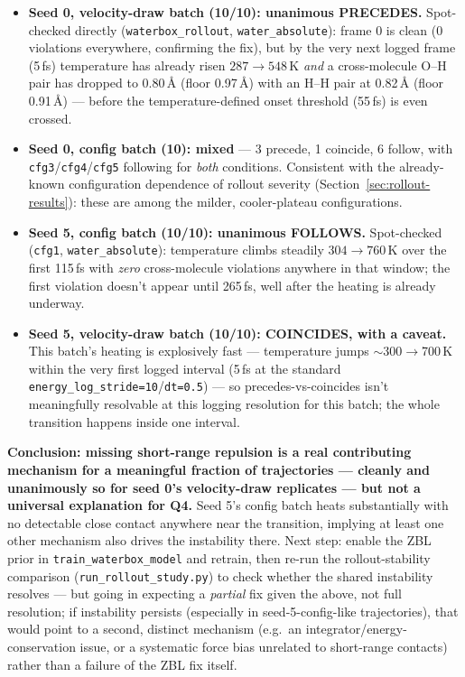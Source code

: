 \documentclass[11pt]{article}
\begin{document}
\begin{itemize}
\item \textbf{Seed 0, velocity-draw batch (10/10): unanimous PRECEDES.}
Spot-checked directly (\texttt{waterbox\_rollout}, \texttt{water\_absolute}):
frame 0 is clean (0 violations everywhere, confirming the fix), but by the
very next logged frame (5\,fs) temperature has already risen $287\to548$\,K
\emph{and} a cross-molecule O--H pair has dropped to 0.80\,\AA{} (floor
0.97\,\AA) with an H--H pair at 0.82\,\AA{} (floor 0.91\,\AA) --- before the
temperature-defined onset threshold (55\,fs) is even crossed.
\item \textbf{Seed 0, config batch (10): mixed} --- 3 precede, 1 coincide, 6
follow, with \texttt{cfg3}/\texttt{cfg4}/\texttt{cfg5} following for
\emph{both} conditions. Consistent with the already-known configuration
dependence of rollout severity (Section~\ref{sec:rollout-results}): these
are among the milder, cooler-plateau configurations.
\item \textbf{Seed 5, config batch (10/10): unanimous FOLLOWS.}
Spot-checked (\texttt{cfg1}, \texttt{water\_absolute}): temperature climbs
steadily $304\to760$\,K over the first 115\,fs with \emph{zero}
cross-molecule violations anywhere in that window; the first violation
doesn't appear until 265\,fs, well after the heating is already underway.
\item \textbf{Seed 5, velocity-draw batch (10/10): COINCIDES, with a
caveat.} This batch's heating is explosively fast --- temperature jumps
$\sim$300$\to$700\,K within the very first logged interval (5\,fs at the
standard \texttt{energy\_log\_stride=10}/\texttt{dt=0.5}) --- so
precedes-vs-coincides isn't meaningfully resolvable at this logging
resolution for this batch; the whole transition happens inside one interval.
\end{itemize}

\textbf{Conclusion: missing short-range repulsion is a real contributing
mechanism for a meaningful fraction of trajectories --- cleanly and
unanimously so for seed 0's velocity-draw replicates --- but not a universal
explanation for Q4.} Seed 5's config batch heats substantially with no
detectable close contact anywhere near the transition, implying at least one
other mechanism also drives the instability there. Next step: enable the ZBL
prior in \texttt{train\_waterbox\_model} and retrain, then re-run the
rollout-stability comparison (\texttt{run\_rollout\_study.py}) to check
whether the shared instability resolves --- but going in expecting a
\emph{partial} fix given the above, not full resolution; if instability
persists (especially in seed-5-config-like trajectories), that would point to
a second, distinct mechanism (e.g.\ an integrator/energy-conservation issue,
or a systematic force bias unrelated to short-range contacts) rather than a
failure of the ZBL fix itself.
\end{document}
